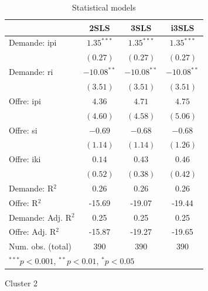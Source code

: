 \documentclass[11pt,]{article}
\begin{document}
\FloatBarrier

\begin{table}[!htbp]
\begin{center}
\begin{tabular}{l c c c }
\hline
 & 2SLS & 3SLS & i3SLS \\
\hline
Demande: ipi        & $1.35^{***}$  & $1.35^{***}$  & $1.35^{***}$  \\
                    & $(0.27)$      & $(0.27)$      & $(0.27)$      \\
Demande: ri         & $-10.08^{**}$ & $-10.08^{**}$ & $-10.08^{**}$ \\
                    & $(3.51)$      & $(3.51)$      & $(3.51)$      \\
Offre: ipi          & $4.36$        & $4.71$        & $4.75$        \\
                    & $(4.60)$      & $(4.58)$      & $(5.06)$      \\
Offre: si           & $-0.69$       & $-0.68$       & $-0.68$       \\
                    & $(1.14)$      & $(1.14)$      & $(1.26)$      \\
Offre: iki          & $0.14$        & $0.43$        & $0.46$        \\
                    & $(0.52)$      & $(0.38)$      & $(0.42)$      \\
\hline
Demande: R$^2$      & 0.26          & 0.26          & 0.26          \\
Offre: R$^2$        & -15.69        & -19.07        & -19.44        \\
Demande: Adj. R$^2$ & 0.25          & 0.25          & 0.25          \\
Offre: Adj. R$^2$   & -15.87        & -19.27        & -19.65        \\
Num. obs. (total)   & 390           & 390           & 390           \\
\hline
\multicolumn{4}{l}{\scriptsize{$^{***}p<0.001$, $^{**}p<0.01$, $^*p<0.05$}}
\end{tabular}
\caption{Statistical models}
\label{table : 2sls, 3sls and fiml cluster 1}
\end{center}
\end{table}

\FloatBarrier

Cluster 2

\FloatBarrier
\end{document}
